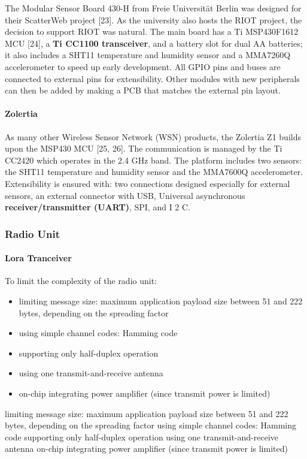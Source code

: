 The Modular Sensor Board 430-H from Freie Universität Berlin was designed for their ScatterWeb project [23].
As the university also hosts the RIOT project,
	the decision to support RIOT was natural.
The main board has a Ti MSP430F1612 MCU [24],
	a \textbf{Ti CC1100 transceiver},
	and a battery slot for dual AA batteries;
	it also includes a SHT11 temperature and humidity sensor and a MMA7260Q accelerometer to speed up early development.
All GPIO pins and buses are connected to external pins for extensibility.
Other modules with new peripherals can then be added by making a PCB that matches the external pin layout.

\paragraph{Zolertia}

As many other Wireless Sensor Network (WSN) products,
	the Zolertia Z1 builds upon the MSP430 MCU [25, 26].
The communication is managed by the Ti CC2420 which operates in the 2.4 GHz band.
The platform includes two sensors:
	the SHT11 temperature and humidity sensor and the MMA7600Q accelerometer.
Extensibility is ensured with:
	two connections designed especially for external sensors,
	an external connector with USB,
	Universal asynchronous \textbf{receiver/transmitter (UART)},
	SPI,
	and I 2 C.

\subsubsection{Radio Unit}

\paragraph{Lora Tranceiver}

To limit the complexity of the radio unit:

\begin{itemize}
	\item limiting message size: maximum application payload size between 51 and 222 bytes, depending on the spreading factor
	\item using simple channel codes: Hamming code
	\item supporting only half-duplex operation
	\item using one transmit-and-receive antenna
	\item on-chip integrating power amplifier (since transmit power is limited)

\end{itemize}
limiting message size: maximum application payload size between 51 and 222 bytes, depending on the spreading factor
using simple channel codes: Hamming code
supporting only half-duplex operation
using one transmit-and-receive antenna
on-chip integrating power amplifier (since transmit power is limited)

